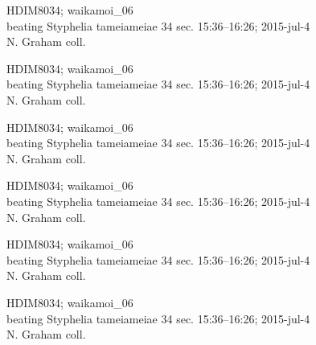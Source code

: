 \documentclass[2pt]{extarticle}
\begin{document}
\noindent
\parbox{0.16\textwidth}{\tiny \raggedright \rule[-0.3\baselineskip]{0pt}{10pt}HDIM8034; waikamoi\_06\\ beating Styphelia tameiameiae 34 sec. 15:36--16:26; 2015-jul-4\\ N. Graham coll.}
\parbox{0.16\textwidth}{\tiny \raggedright \rule[-0.3\baselineskip]{0pt}{10pt}HDIM8034; waikamoi\_06\\ beating Styphelia tameiameiae 34 sec. 15:36--16:26; 2015-jul-4\\ N. Graham coll.}
\parbox{0.16\textwidth}{\tiny \raggedright \rule[-0.3\baselineskip]{0pt}{10pt}HDIM8034; waikamoi\_06\\ beating Styphelia tameiameiae 34 sec. 15:36--16:26; 2015-jul-4\\ N. Graham coll.}
\parbox{0.16\textwidth}{\tiny \raggedright \rule[-0.3\baselineskip]{0pt}{10pt}HDIM8034; waikamoi\_06\\ beating Styphelia tameiameiae 34 sec. 15:36--16:26; 2015-jul-4\\ N. Graham coll.}
\parbox{0.16\textwidth}{\tiny \raggedright \rule[-0.3\baselineskip]{0pt}{10pt}HDIM8034; waikamoi\_06\\ beating Styphelia tameiameiae 34 sec. 15:36--16:26; 2015-jul-4\\ N. Graham coll.}
\parbox{0.16\textwidth}{\tiny \raggedright \rule[-0.3\baselineskip]{0pt}{10pt}HDIM8034; waikamoi\_06\\ beating Styphelia tameiameiae 34 sec. 15:36--16:26; 2015-jul-4\\ N. Graham coll.} \\ 
\vspace{0.001in} 
\end{document}
